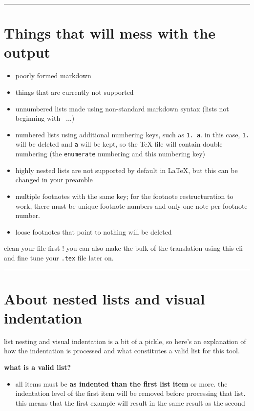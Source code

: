 \documentclass[a4paper, 12pt, twoside]{article}
\begin{document}
\par\noindent\rule{\linewidth}{0.4pt}
\section*{Things that will mess with the output}

\begin{itemize}
\item poorly formed markdown
\item things that are currently not supported
\item unnumbered lists made using non-standard markdown syntax (lists not beginning with \texttt{-}...)
\item numbered lists using additional numbering keys, such as \texttt{1. a}. in this case, \texttt{1.} will be deleted and \texttt{a} will be kept, so the TeX file will contain double numbering (the \texttt{enumerate} numbering and this numbering key)
\item highly nested lists are not supported by default in LaTeX, but this can be changed in your preamble
\item multiple footnotes with the same key; for the footnote restructuration to work, there must be unique footnote numbers and only one note per footnote number.
\item loose footnotes that point to nothing will be deleted 
\end{itemize}

clean your file first ! you can also make the bulk of the translation using this cli and fine tune your \texttt{.tex} 
file later on.

\par\noindent\rule{\linewidth}{0.4pt}
\section*{About nested lists and visual indentation}

list nesting and visual indentation is a bit of a pickle, so here's an explanation of how
the indentation is processed and what constitutes a valid list for this tool.

\textbf{what is a valid list?}

\begin{itemize}
\item all items must be \textbf{as indented than the first list item} or more. the indentation level of the first item will be removed before processing that list. this means that the first example will result in the same result as the second 
\end{itemize}
\end{document}
